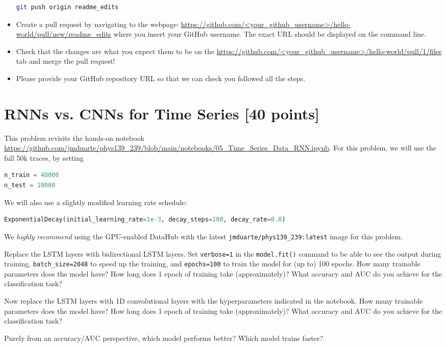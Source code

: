 \begin{problem}[20]
\begin{itemize}
	      \begin{lstlisting}[language=bash]
git push origin readme_edits
\end{lstlisting}
	\item Create a pull request by navigating to the webpage: \url{https://github.com/<your_github_username>/hello-world/pull/new/readme_edits} where you insert your GitHub username.
	      The exact URL should be displayed on the command line.
	\item Check that the changes are what you expect them to be on the \url{https://github.com/<your_github_username>/hello-world/pull/1/files} tab and merge the pull request!
	\item Please provide your GitHub repository URL so that we can check you followed all the steps.
\end{itemize}
\end{problem}

\section{RNNs vs. CNNs for Time Series [40 points]}

This problem revisits the hands-on notebook \url{https://github.com/jmduarte/phys139_239/blob/main/notebooks/05_Time_Series_Data_RNN.ipynb}.
For this problem, we will use the full 50k traces, by setting
\begin{lstlisting}[language=python]
n_train = 40000
n_test = 10000
\end{lstlisting}
We will also use a slightly modified learning rate schedule:
\begin{lstlisting}[language=python]
ExponentialDecay(initial_learning_rate=1e-3, decay_steps=100, decay_rate=0.8)
\end{lstlisting}
We \emph{highly recommend} using the GPU-enabled DataHub with the latest \texttt{jmduarte/phys139_239:latest} image for this problem.

\begin{problem}[15]
Replace the LSTM layers with bidirectional LSTM layers.
Set \texttt{verbose=1} in the \texttt{model.fit()} command to be able to see the output during training, \texttt{batch\_size=2048} to speed up the training, and \texttt{epochs=100} to train the model for (up to) 100 epochs.
How many trainable parameters does the model have?
How long does 1 epoch of training take (approximately)?
What accuracy and AUC do you achieve for the classification task?
\end{problem}


\begin{problem}[15]
Now replace the LSTM layers with 1D convolutional layers with the hyperparameters indicated in the notebook.
How many trainable parameters does the model have?
How long does 1 epoch of training take (approximately)?
What accuracy and AUC do you achieve for the classification task?
\end{problem}

\begin{problem}[10]
Purely from an accuracy/AUC perspective, which model performs better?
Which model trains faster?
\end{problem}


